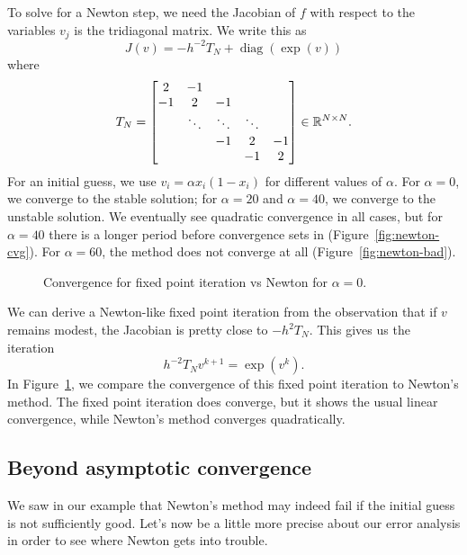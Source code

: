 \documentclass[12pt, leqno]{article} %
\begin{document}
To solve for a Newton step, we need the Jacobian of $f$ with respect
to the variables $v_j$ is the tridiagonal matrix.  We write this
as
\[
J(v) = -h^{-2} T_N + \operatorname{diag}(\exp(v))
\]
where
\[
T_N =
\begin{bmatrix}
  2 & -1 \\
  -1 & 2 & -1 \\
  & \ddots & \ddots & \ddots \\
  & & -1 & 2 & -1 \\
  & & & -1 & 2
\end{bmatrix} \in \mathbb{R}^{N \times N}.
\]
For an initial guess, we use $v_i = \alpha x_i (1-x_i)$ for different
values of $\alpha$.  For $\alpha = 0$, we converge to the stable
solution; for $\alpha = 20$ and $\alpha = 40$, we converge to the
unstable solution.  We eventually see quadratic convergence in all
cases, but for $\alpha = 40$ there is a longer period before
convergence sets in (Figure~\ref{fig:newton-cvg}).  For $\alpha = 60$,
the method does not converge at all (Figure~\ref{fig:newton-bad}).

\begin{figure}
\caption{Convergence for fixed point iteration vs Newton for $\alpha =
  0$.}
\label{fig:compare-cvg}
\end{figure}

We can derive a Newton-like fixed point iteration from the observation
that if $v$ remains modest, the Jacobian is pretty close to
$-h^2 T_N$.  This gives us the iteration
\[
  h^{-2} T_N v^{k+1} = \exp(v^k).
\]
In Figure~\ref{fig:compare-cvg}, we compare the convergence of this
fixed point iteration to Newton's method.  The fixed point iteration
does converge, but it shows the usual linear convergence, while
Newton's method converges quadratically.

\subsection*{Beyond asymptotic convergence}

We saw in our example that Newton's method may indeed fail if the
initial guess is not sufficiently good.  Let's now be a little more
precise about our error analysis in order to see where Newton gets
into trouble.
\end{document}
